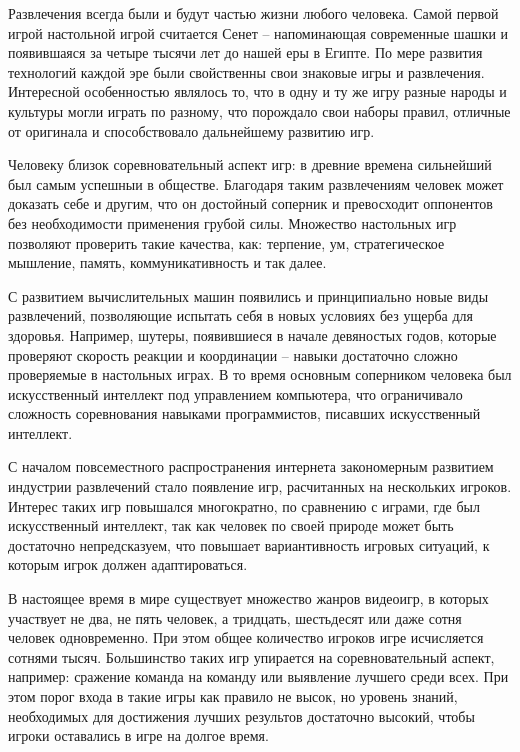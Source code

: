 \label{sec:introduction}

Развлечения всегда были и будут частью жизни любого человека. Самой первой игрой настольной игрой считается Сенет -- напоминающая современные шашки
и появившаяся за четыре тысячи лет до нашей еры в Египте. По мере развития технологий каждой эре были свойственны свои знаковые игры и развлечения.
Интересной особенностью являлось то, что в одну и ту же игру разные народы и культуры могли играть по разному, что порождало свои наборы правил, отличные от
оригинала и способствовало дальнейшему развитию игр.

Человеку близок соревновательный аспект игр: в древние времена сильнейший был самым успешныи в обществе. Благодаря таким развлечениям человек может доказать себе
и другим, что он достойный соперник и превосходит оппонентов без необходимости применения грубой силы. Множество настольных игр позволяют проверить такие качества, как:
терпение, ум, стратегическое мышление, память, коммуникативность и так далее. 

С развитием вычислительных машин появились и принципиально новые виды развлечений, позволяющие испытать себя в новых условиях без ущерба для здоровья. Например, шутеры,
появившиеся в начале девяностых годов, которые проверяют скорость реакции и координации -- навыки достаточно сложно проверяемые в настольных играх. В то время основным соперником
человека был искусственный интеллект под управлением компьютера, что ограничивало сложность соревнования навыками программистов, писавших искусственный интеллект.

С началом повсеместного распространения интернета закономерным развитием индустрии развлечений стало появление игр, расчитанных на нескольких игроков. Интерес таких игр повышался
многократно, по сравнению с играми, где был искусственный интеллект, так как человек по своей природе может быть достаточно непредсказуем, что повышает вариантивность игровых ситуаций,
к которым игрок должен адаптироваться. 

В настоящее время в мире существует множество жанров видеоигр, в которых участвует не два, не пять человек, а тридцать, шестьдесят или даже сотня человек одновременно. При этом 
общее количество игроков игре исчисляется сотнями тысяч. Большинство таких игр упирается на соревновательный аспект, например: сражение команда на команду или выявление 
лучшего среди всех. При этом порог входа в такие игры как правило не высок, но уровень знаний, необходимых для достижения лучших результов достаточно высокий, 
чтобы игроки оставались в игре на долгое время.

